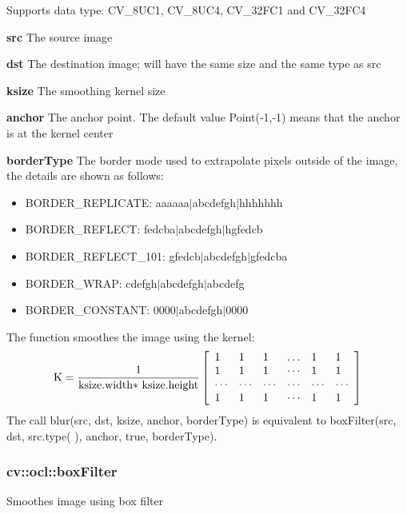 \documentclass{article}
\begin{document}
Supports data type: CV{\_}8UC1, CV{\_}8UC4, CV{\_}32FC1 and CV{\_}32FC4

\textbf{src }The source image

\textbf{dst }The destination image; will have the same size and the same
type as src

\textbf{ksize }The smoothing kernel size

\textbf{anchor }The anchor point. The default value Point(-1,-1) means that
the anchor is at the kernel center

\textbf{borderType }The border mode used to extrapolate pixels outside of
the image, the details are shown as follows:

\begin{itemize}
\item BORDER{\_}REPLICATE: aaaaaa$\vert $abcdefgh$\vert $hhhhhhh
\item BORDER{\_}REFLECT: fedcba$\vert $abcdefgh$\vert $hgfedcb
\item BORDER{\_}REFLECT{\_}101: gfedcb$\vert $abcdefgh$\vert $gfedcba
\item BORDER{\_}WRAP: cdefgh$\vert $abcdefgh$\vert $abcdefg
\item BORDER{\_}CONSTANT: 0000$\vert $abcdefgh$\vert $0000
\end{itemize}

The function smoothes the image using the kernel:
\[
\mbox{K}=\frac{1}{\mbox{ksize.width$\ast$ ksize.height}}\left[
{{\begin{array}{*{20}c}
 1 \hfill & 1 \hfill & 1 \hfill & \ldots \hfill & 1 \hfill & 1 \hfill \\
 1 \hfill & 1 \hfill & 1 \hfill & \cdots \hfill & 1 \hfill & 1 \hfill \\
 \cdots \hfill & \cdots \hfill & \cdots \hfill & \cdots \hfill & \cdots
\hfill & \cdots \hfill \\
 1 \hfill & 1 \hfill & 1 \hfill & \cdots \hfill & 1 \hfill & 1 \hfill \\
\end{array} }} \right]
\]
The call blur(src, dst, ksize, anchor, borderType) is equivalent to
boxFilter(src, dst, src.type( ), anchor, true, borderType).

\newpage

\subsubsection{cv::ocl::boxFilter }
\label{subsubsec:mylabel33}
Smoothes image using box filter
\end{document}
